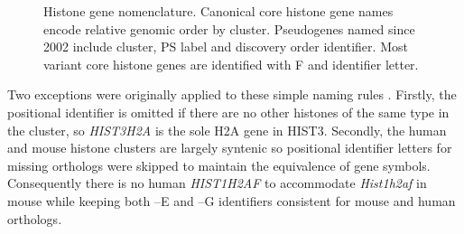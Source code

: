     \begin{figure*}
      \centering
      \caption{Histone gene nomenclature.
               Canonical core histone gene names encode relative genomic order by cluster.
               Pseudogenes named since 2002 include cluster, PS label and discovery order identifier.
               Most variant core histone genes are identified with F and identifier letter.}
      \label{fig:nomenclature}
    \end{figure*}

    Two exceptions were originally applied to these simple naming rules \citep{Marzluff02}.
    Firstly, the positional identifier is omitted if there are no
    other histones of the same type in the cluster,
    so \textit{HIST3H2A} is the sole H2A gene in HIST3.
    Secondly, the human and mouse histone clusters are largely syntenic
    so positional identifier letters for missing orthologs were skipped
    to maintain the equivalence of gene symbols.
    Consequently there is no human \textit{HIST1H2AF} to accommodate
    \textit{Hist1h2af} in mouse while keeping both --E and --G identifiers
    consistent for mouse and human orthologs.

